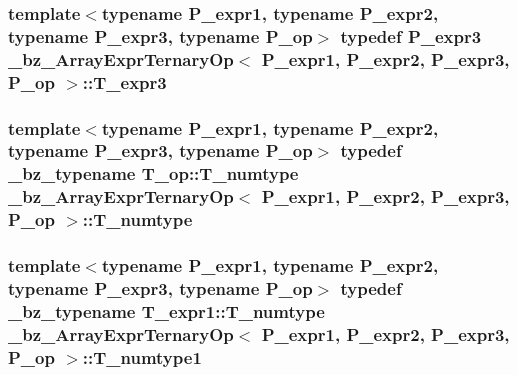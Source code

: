 \subsubsection[{T\+\_\+expr3}]{\setlength{\rightskip}{0pt plus 5cm}template$<$typename P\+\_\+expr1, typename P\+\_\+expr2, typename P\+\_\+expr3, typename P\+\_\+op$>$ typedef P\+\_\+expr3 {\bf \+\_\+bz\+\_\+\+Array\+Expr\+Ternary\+Op}$<$ P\+\_\+expr1, P\+\_\+expr2, P\+\_\+expr3, P\+\_\+op $>$\+::{\bf T\+\_\+expr3}}\label{class__bz__ArrayExprTernaryOp_a809b1acdc0c2ffe359711f40d2688526}
\hypertarget{class__bz__ArrayExprTernaryOp_a9a66d06520e4d8bedb6c754d3f106949}{}
\subsubsection[{T\+\_\+numtype}]{\setlength{\rightskip}{0pt plus 5cm}template$<$typename P\+\_\+expr1, typename P\+\_\+expr2, typename P\+\_\+expr3, typename P\+\_\+op$>$ typedef {\bf \+\_\+bz\+\_\+typename} T\+\_\+op\+::\+T\+\_\+numtype {\bf \+\_\+bz\+\_\+\+Array\+Expr\+Ternary\+Op}$<$ P\+\_\+expr1, P\+\_\+expr2, P\+\_\+expr3, P\+\_\+op $>$\+::{\bf T\+\_\+numtype}}\label{class__bz__ArrayExprTernaryOp_a9a66d06520e4d8bedb6c754d3f106949}
\hypertarget{class__bz__ArrayExprTernaryOp_adabbc0a8e4ddd154eaa0eb4eb4d78d85}{}
\subsubsection[{T\+\_\+numtype1}]{\setlength{\rightskip}{0pt plus 5cm}template$<$typename P\+\_\+expr1, typename P\+\_\+expr2, typename P\+\_\+expr3, typename P\+\_\+op$>$ typedef {\bf \+\_\+bz\+\_\+typename} T\+\_\+expr1\+::\+T\+\_\+numtype {\bf \+\_\+bz\+\_\+\+Array\+Expr\+Ternary\+Op}$<$ P\+\_\+expr1, P\+\_\+expr2, P\+\_\+expr3, P\+\_\+op $>$\+::{\bf T\+\_\+numtype1}}\label{class__bz__ArrayExprTernaryOp_adabbc0a8e4ddd154eaa0eb4eb4d78d85}
\hypertarget{class__bz__ArrayExprTernaryOp_abafc4185679a1752fa00ff28a3067612}{}
